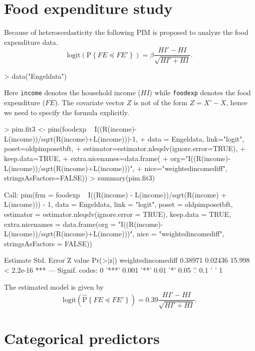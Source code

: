 \documentclass[12pt]{article}
\newcommand{\prob}[1]{\text{P}\left\{#1\right\}}
\newcommand{\hatprob}[1]{\hat{\text{P}}\left\{#1\right\}}
\newcommand{\leqs}{\preccurlyeq}
\begin{document}
\section{Food expenditure study}\label{S_fe}

Because of heteroscedasticity the following PIM is proposed to analyze the food expenditure data.
\[
\text{logit}\left( \prob{FE \leqs FE' } \right) = \beta \frac{HI' - HI}{\sqrt{HI' + HI}}.  
\]
\begin{Schunk}
\begin{Sinput}
> data("Engeldata")
\end{Sinput}
\end{Schunk}
Here \verb|income| denotes the household income ($HI$) while \verb|foodexp| denotes the food expenditure ($FE$). The covariate vector $Z$ is not of the form $Z = X' - X$, hence we need to specify the formula explicitly. 
\begin{Schunk}
\begin{Sinput}
> pim.fit3 <- pim(foodexp ~ I((R(income)-L(income))/sqrt(R(income)+L(income)))-1, 
+ 								data = Engeldata, link="logit", poset=oldpimposetbft, 
+ 								estimator=estimator.nleqslv(ignore.error=TRUE), 
+ 								keep.data=TRUE, 
+ 								extra.nicenames=data.frame(
+ 									org="I((R(income)-L(income))/sqrt(R(income)+L(income)))", 
+ 									nice="weightedincomediff", stringsAsFactors=FALSE))
> summary(pim.fit3)				
\end{Sinput}
\begin{Soutput}
Call:
pim(frm = foodexp ~ I((R(income) - L(income))/sqrt(R(income) + 
    L(income))) - 1, data = Engeldata, link = "logit", poset = oldpimposetbft, 
    estimator = estimator.nleqslv(ignore.error = TRUE), keep.data = TRUE, 
    extra.nicenames = data.frame(org = "I((R(income)-L(income))/sqrt(R(income)+L(income)))", 
        nice = "weightedincomediff", stringsAsFactors = FALSE))

                   Estimate Std. Error Z value  Pr(>|z|)    
weightedincomediff  0.38971    0.02436  15.998 < 2.2e-16 ***
---
Signif. codes:  0 '***' 0.001 '**' 0.01 '*' 0.05 '.' 0.1 ' ' 1 
\end{Soutput}
\end{Schunk}
The estimated model is given by 
\[
\text{logit}\left( \hatprob{FE \leqs FE' } \right) =  0.39 \frac{HI' - HI}{\sqrt{HI' + HI}}.  
\]



\section{Categorical predictors}\label{S_categorical}
\end{document}
